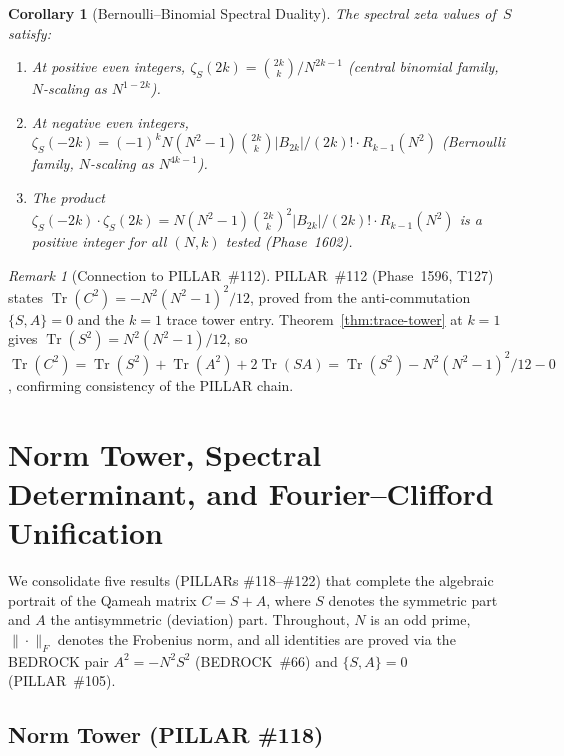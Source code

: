 \documentclass[aps,prd,twocolumn,superscriptaddress,floatfix,nofootinbib]{revtex4-2}
\newtheorem{corollary}[theorem]{Corollary}
\theoremstyle{definition}
\theoremstyle{remark}
\newtheorem{remark}[theorem]{Remark}
\begin{document}
\begin{corollary}[Bernoulli--Binomial Spectral Duality]
The spectral zeta values of~$S$ satisfy:
\begin{enumerate}[label=(\roman*)]
  \item At positive even integers, $\zeta_S(2k) = \binom{2k}{k}/N^{2k-1}$
        (central binomial family, $N$-scaling as $N^{1-2k}$).
  \item At negative even integers, $\zeta_S(-2k) = (-1)^k N(N^2-1)\binom{2k}{k}
        |B_{2k}|/(2k)!\cdot R_{k-1}(N^2)$ (Bernoulli family, $N$-scaling as $N^{4k-1}$).
  \item The product $\zeta_S(-2k)\cdot\zeta_S(2k) = N(N^2-1)\binom{2k}{k}^2
        |B_{2k}|/(2k)!\cdot R_{k-1}(N^2)$ is a \emph{positive integer}
        for all $(N,k)$ tested (Phase~1602).
\end{enumerate}
\end{corollary}

\begin{remark}[Connection to PILLAR~\#112]
PILLAR~\#112 (Phase~1596, T127) states
$\operatorname{Tr}(C^2) = -N^2(N^2-1)^2/12$,
proved from the anti-commutation $\{S,A\}=0$ and the $k=1$ trace tower entry.
Theorem~\ref{thm:trace-tower} at $k=1$ gives
$\operatorname{Tr}(S^2) = N^2(N^2-1)/12$,
so $\operatorname{Tr}(C^2) = \operatorname{Tr}(S^2) + \operatorname{Tr}(A^2) + 2\operatorname{Tr}(SA)
= \operatorname{Tr}(S^2) - N^2(N^2-1)^2/12 - 0$,
confirming consistency of the PILLAR chain.
\end{remark}

\section{Norm Tower, Spectral Determinant, and Fourier--Clifford Unification}
\label{sec:norm-det-fourier}

We consolidate five results (PILLARs \#118--\#122) that complete the algebraic
portrait of the Qameah matrix $C = S + A$, where $S$ denotes the symmetric part
and $A$ the antisymmetric (deviation) part.  Throughout, $N$ is an odd prime,
$\|\cdot\|_F$ denotes the Frobenius norm, and all identities are proved via the
BEDROCK pair $A^2 = -N^2 S^2$ (BEDROCK~\#66) and $\{S,A\}=0$ (PILLAR~\#105).

\subsection{Norm Tower (PILLAR \#118)}
\label{sec:norm-tower}
\end{document}
